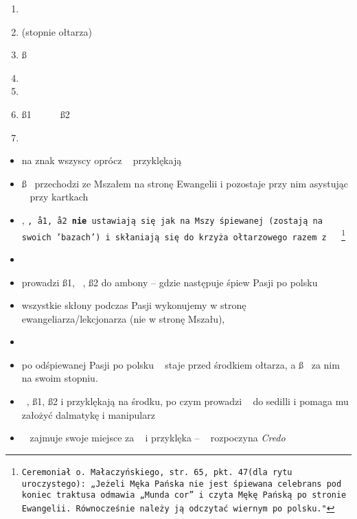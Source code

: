 \begin{enumerate}\centering
  \item[] \ii
  \item[] (stopnie ołtarza)
  \item[] \ss
  \item[]
  \item[]
  \item[] \ss1~~~\dd~~~\ss2
  \item[] 
\end{enumerate}


\begin{itemize}
  \item na znak  wszyscy oprócz \ii~ przyklękają
  \item \ss~ przechodzi ze Mszałem na stronę Ewangelii i pozostaje przy
        nim asystując \ii~ przy kartkach
  \item {}, \tt, \aa1, \aa2
        \textbf{nie} ustawiają się jak na Mszy śpiewanej (zostają na swoich
        'bazach') i skłaniają się do krzyża ołtarzowego razem z \ii~
        \footnote{Ceremoniał o. Małaczyńskiego, str. 65, pkt. 47(dla rytu
          uroczystego): „Jeżeli Męka Pańska nie jest śpiewana celebrans pod koniec
          traktusa odmawia „Munda cor” i czyta Mękę Pańską po stronie Ewangelii.
          Równocześnie należy ją odczytać wiernym  po polsku."}
  \item[]
  \item {} prowadzi \ss1, \dd~, \ss2 do
        ambony – gdzie następuje śpiew Pasji po polsku
  \item wszystkie skłony podczas Pasji wykonujemy w stronę
        ewangeliarza/lekcjonarza (nie w stronę Mszału),
  \item[]
  \item po odśpiewanej Pasji po polsku \ii~ staje przed środkiem
        ołtarza, a \ss~ za nim na swoim stopniu.
  \item \dd~, \ss1, \ss2 i 
        przyklękają na środku, po czym  prowadzi \dd~ do
        sedilli i pomaga mu założyć dalmatykę i manipularz
  \item \dd~ zajmuje swoje miejsce za \ii~ i przyklęka --
        \ii~ rozpoczyna \textit{Credo}
\end{itemize}

